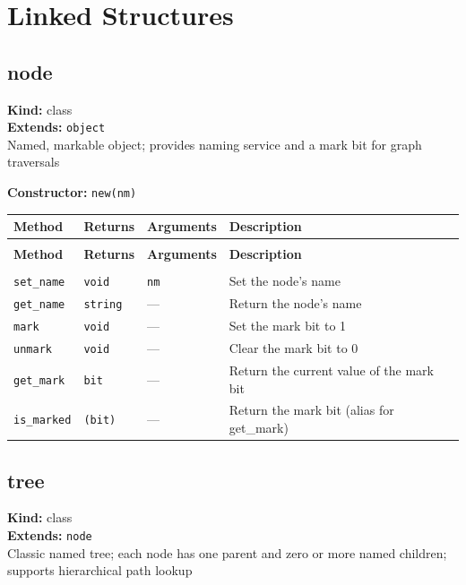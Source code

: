 \documentclass[11pt,letterpaper]{report}
\begin{document}
\chapter{Linked Structures}

\section{node}
\label{cls:node}

\noindent\textbf{Kind:} class\\
\noindent\textbf{Extends:} \texttt{object}\\
\noindent Named, markable object; provides naming service and a mark bit for graph traversals

\noindent\textbf{Constructor:} \texttt{new(nm)}

\begin{xltabular}{\linewidth}{>{\small}p{1.35in} >{\small}p{1.25in} >{\small}p{0.95in} >{\small}X}
\toprule
\textbf{Method} & \textbf{Returns} & \textbf{Arguments} & \textbf{Description} \\
\midrule
\endfirsthead
{} \\
\midrule
\textbf{Method} & \textbf{Returns} & \textbf{Arguments} & \textbf{Description} \\
\midrule
\endhead
\midrule
{} \\
\endfoot
\bottomrule
\endlastfoot
\texttt{set\_name} & \texttt{void} & \texttt{nm} & Set the node's name \\
\texttt{get\_name} & \texttt{string} & --- & Return the node's name \\
\texttt{mark} & \texttt{void} & --- & Set the mark bit to 1 \\
\texttt{unmark} & \texttt{void} & --- & Clear the mark bit to 0 \\
\texttt{get\_mark} & \texttt{bit} & --- & Return the current value of the mark bit \\
\texttt{is\_marked} & \texttt{(bit)} & --- & Return the mark bit (alias for get\_mark) \\
\end{xltabular}

\section{tree}
\label{cls:tree}

\noindent\textbf{Kind:} class\\
\noindent\textbf{Extends:} \texttt{node}\\
\noindent Classic named tree; each node has one parent and zero or more named children; supports hierarchical path lookup
\end{document}
